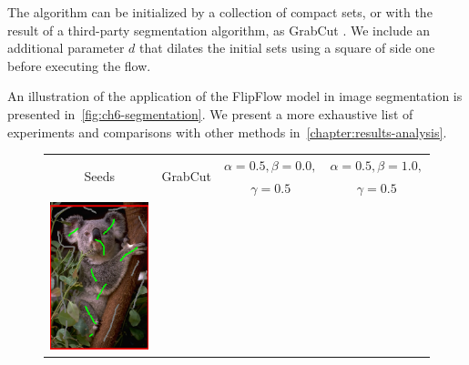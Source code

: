 {The algorithm can be initialized by a collection of compact sets, or with the result of a third-party segmentation algorithm, as GrabCut \cite{rother04grabcut}. We include an additional parameter $d$ that dilates the initial sets using a square of side one before executing the flow.

An illustration of the application of the FlipFlow model in image segmentation is presented in~\cref{fig:ch6-segmentation}. We present a more exhaustive list of experiments and comparisons with other methods in~\cref{chapter:results-analysis}.
	
\begin{figure}
\center
\begin{tabular}{cccc}
\multirow{2}{*}{Seeds} & \multirow{2}{*}{GrabCut} & $\alpha=0.5, \beta=0.0,$ & $\alpha=0.5, \beta=1.0,$ \\
& & $\gamma=0.5$ & $\gamma=0.5$\\
 	\includegraphics[scale=0.25]{figures/chapter6/segmentation/coala/mt_improve/radius_5/data_0.50/sq_0.00/length_0.50/it_50/seeds.png} & 

\end{tabular}
\end{figure}}
